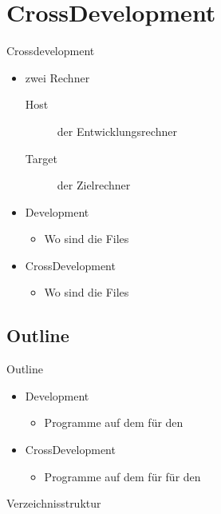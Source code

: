 \section{CrossDevelopment}
\begin{frame}{Crossdevelopment}
 \begin{itemize}
  \item zwei Rechner
  \begin{description}
   \item[Host] der Entwicklungsrechner
   \item[Target] \targetS der Zielrechner
  \end{description}
  \item Development
  \begin{itemize}
   \item Wo sind die Files
  \end{itemize}
  \item CrossDevelopment
  \begin{itemize}
   \item Wo sind die Files
  \end{itemize}
 \end{itemize}
\end{frame}

\subsection{Outline}
\begin{frame}{Outline}
 \begin{itemize}
  \item Development
  \begin{itemize}
   \item Programme auf dem \host für den \host
  \end{itemize}
  \item CrossDevelopment
  \begin{itemize}
   \item Programme auf dem \host für für den \target
  \end{itemize}
 \end{itemize}
\end{frame}

\begin{frame}{Verzeichnisstruktur}
\end{frame}

